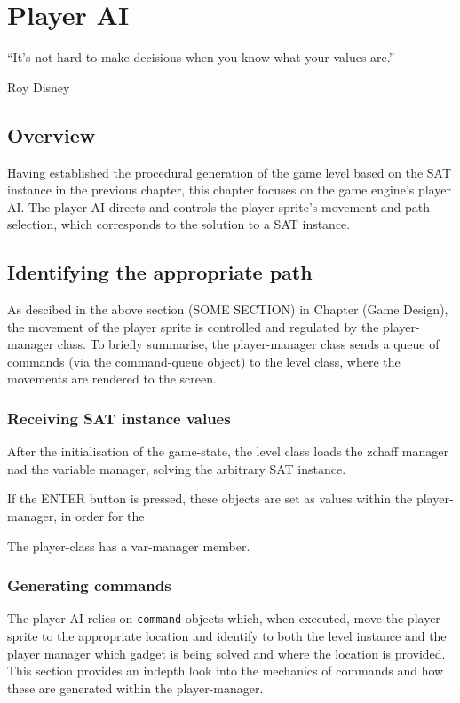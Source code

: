 \documentclass[11pt, a4paper, oneside]{report} %
\begin{document}
\chapter{Player AI}

\epigraph{``It's not hard to make decisions when you know what your values
are.''}{Roy Disney}

\section{Overview}

Having established the procedural generation of the game level based on the SAT
instance in the previous chapter, this chapter focuses on the game engine's
player AI. The player AI directs and controls the player sprite's movement and
path selection, which corresponds to the solution to a SAT instance.

\section{Identifying the appropriate path}

As descibed in the above section (SOME SECTION) in Chapter (Game Design), the
movement of the player sprite is controlled and regulated by the player-manager
class. To briefly summarise, the player-manager class sends a queue of commands
(via the command-queue object) to the level class, where the movements are
rendered to the screen. 

\subsection{Receiving SAT instance values}

After the initialisation of the game-state, the level class loads the zchaff
manager nad the variable manager, solving the arbitrary SAT instance.

If the ENTER button is pressed, these objects are set as values within the
player-manager, in order for the

The player-class has a var-manager member. 

\subsection{Generating commands}

The player AI relies on \texttt{command} objects which, when executed, move the
player sprite to the appropriate location and identify to both the level
instance and the player manager which gadget is being solved and where the
location is provided. This section provides an indepth look into the mechanics
of commands and how these are generated within the player-manager.
\end{document}
